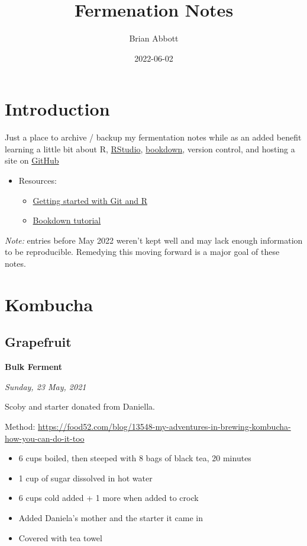 \documentclass[
]{book}
\title{Fermenation Notes}
\author{Brian Abbott}
\date{2022-06-02}
\providecommand{\tightlist}{%
  \setlength{\itemsep}{0pt}\setlength{\parskip}{0pt}}
\begin{document}
\maketitle

{
\setcounter{tocdepth}{1}
\tableofcontents
}
\hypertarget{introduction}{%
\chapter{Introduction}\label{introduction}}

Just a place to archive / backup my fermentation notes while as an added benefit learning a little bit about R, \href{https://www.rstudio.com/}{RStudio}, \href{https://bookdown.org/}{bookdown}, version control, and hosting a site on \href{https://github.com/}{GitHub}

\begin{itemize}
\tightlist
\item
  Resources:

  \begin{itemize}
  \tightlist
  \item
    \href{https://happygitwithr.com/}{Getting started with Git and R}
  \item
    \href{https://bookdown.org/yihui/bookdown/get-started.html}{Bookdown tutorial}
  \end{itemize}
\end{itemize}

\emph{Note:} entries before May 2022 weren't kept well and may lack enough information to be reproducible. Remedying this moving forward is a major goal of these notes.

\hypertarget{kombucha}{%
\chapter{Kombucha}\label{kombucha}}

\hypertarget{grapefruit}{%
\section{Grapefruit}\label{grapefruit}}

\textbf{Bulk Ferment}

\emph{Sunday, 23 May, 2021}

Scoby and starter donated from Daniella.

Method: \url{https://food52.com/blog/13548-my-adventures-in-brewing-kombucha-how-you-can-do-it-too}

\begin{itemize}
\item
  6 cups boiled, then steeped with 8 bags of black tea, 20 minutes
\item
  1 cup of sugar dissolved in hot water
\item
  6 cups cold added + 1 more when added to crock
\item
  Added Daniela's mother and the starter it came in
\item
  Covered with tea towel
\end{itemize}
\end{document}
